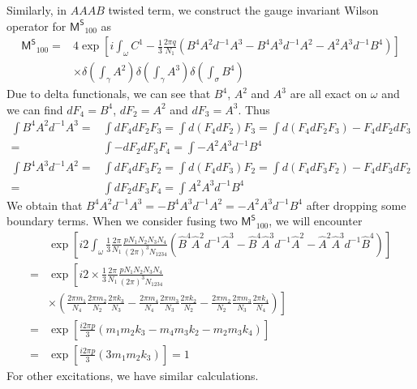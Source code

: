 \documentclass[11pt,nofootinbib,preprint]{revtex4-1}
\begin{document}
Similarly, in $AAAB$ twisted term, we construct the gauge invariant Wilson operator for $\mathsf{M^S}_{100}$ as 
\begin{align}
	\mathsf{M^S}_{100}=&4\exp \left[ i\int_{\omega}{C^1-\frac{1}{3}\frac{2\pi q}{N_1}\left( B^4A^2d^{-1}A^3-B^4A^3d^{-1}A^2-A^2A^3d^{-1}B^4 \right)} \right] \nonumber
	\\
	&\times \delta \left( \int_{\gamma}{A^2} \right) \delta \left( \int_{\gamma}{A^3} \right) \delta \left( \int_{\sigma}{B^4} \right) 
\end{align}
Due to delta functionals, we can see that $B^4$, $A^2$ and $A^3$ are all exact on $\omega$ and we can find $dF_4=B^4$, $dF_2=A^2$ and $dF_3=A^3$. Thus
\begin{align}
	\int{B^4A^2d^{-1}A^3}=&\int{dF_4dF_2F_3}=\int{d\left( F_4dF_2 \right) F_3}=\int{d\left( F_4dF_2F_3 \right) -F_4dF_2dF_3} \nonumber
	\\
	=&\int{-dF_2dF_3F_4}=\int{-A^2A^3d^{-1}B^4}\nonumber
	\\
	\int{B^4A^3d^{-1}A^2}=&\int{dF_4dF_3F_2}=\int{d\left( F_4dF_3 \right) F_2}=\int{d\left( F_4dF_3F_2 \right) -F_4dF_3dF_2}\nonumber
	\\
	=&\int{dF_2dF_3F_4}=\int{A^2A^3d^{-1}B^4}
\end{align}
We obtain that $B^4A^2d^{-1}A^3=-B^4A^3d^{-1}A^2=-A^2A^3d^{-1}B^4$ after dropping some boundary terms. When we consider fusing two $\mathsf{M^S}_{100}$, we will encounter 
\begin{align}
	&\exp \left[ i2\int_{\omega}{\frac{1}{3}\frac{2\pi}{N_1}\frac{pN_1N_2N_3N_4}{\left( 2\pi \right) ^3N_{1234}}\left( \hat{B}^4\hat{A}^2d^{-1}\hat{A}^3-\hat{B}^4\hat{A}^3d^{-1}\hat{A}^2-\hat{A}^2\hat{A}^3d^{-1}\hat{B}^4 \right)} \right] \nonumber
	\\
	=&\exp \left[ i2\times \frac{1}{3}\frac{2\pi}{N_1}\frac{pN_1N_2N_3N_4}{\left( 2\pi \right) ^3N_{1234}} \right. \nonumber
	\\
	&\left. \times \left( \frac{2\pi m_1}{N_4}\frac{2\pi m_2}{N_2}\frac{2\pi k_3}{N_3}-\frac{2\pi m_4}{N_4}\frac{2\pi m_3}{N_3}\frac{2\pi k_2}{N_2}-\frac{2\pi m_2}{N_2}\frac{2\pi m_3}{N_3}\frac{2\pi k_4}{N_4} \right) \right] \nonumber
	\\
	=&\exp \left[ \frac{i2\pi p}{3}\left( m_1m_2k_3-m_4m_3k_2-m_2m_3k_4 \right) \right] \nonumber
	\\
	=&\exp \left[ \frac{i2\pi p}{3}\left( 3m_1m_2k_3\right) \right]=1
\end{align}
For other excitations, we have similar calculations. 
\end{document}
